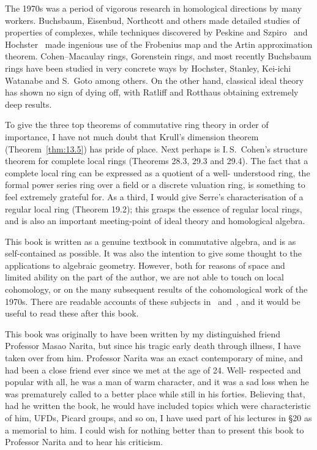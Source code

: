 The 1970s was a period of vigorous research in homological directions by
many workers. Buchsbaum, Eisenbud, Northcott and others made detailed
studies of properties of complexes, while techniques discovered by Peskine
and Szpiro~\cite{PS1} and Hochster~\cite{H} made ingenious use of the Frobenius
map and the Artin approximation theorem. Cohen--Macaulay rings,
Gorenstein rings, and most recently Buchsbaum rings have been studied in
very concrete ways by Hochster, Stanley, Kei-ichi Watanabe and S.\ Goto
among others. On the other hand, classical ideal theory has shown no sign
of dying off, with Ratliff and Rotthaus obtaining extremely deep results.

To give the three top theorems of commutative ring theory in order of
importance, I have not much doubt that Krull's dimension theorem
(Theorem~\ref{thm:13.5}) has pride of place. Next perhaps is I.\,S.\ Cohen's structure
theorem for complete local rings (Theorems 28.3, 29.3 and 29.4). The fact
that a complete local ring can be expressed as a quotient of a well-
understood ring, the formal power series ring over a field or a discrete
valuation ring, is something to feel extremely grateful for. As a third, I
would give Serre's characterisation of a regular local ring (Theorem 19.2);
this grasps the essence of regular local rings, and is also an important
meeting-point of ideal theory and homological algebra.

This book is written as a genuine textbook in commutative algebra, and
is as self-contained as possible. It was also the intention to give some
thought to the applications to algebraic geometry. However, both for
reasons of space and limited ability on the part of the author, we are not
able to touch on local cohomology, or on the many subsequent results of
the cohomological work of the 1970s. There are readable accounts of these
subjects in~\cite{G6} and~\cite{H}, and it would be useful to read these after this
book.

This book was originally to have been written by my distinguished friend
Professor Masao Narita, but since his tragic early death through illness, I
have taken over from him. Professor Narita was an exact contemporary of
mine, and had been a close friend ever since we met at the age of 24. Well-
respected and popular with all, he was a man of warm character, and it was
a sad loss when he was prematurely called to a better place while still in his
forties. Believing that, had he written the book, he would have included
topics which were characteristic of him, UFDs, Picard groups, and so on,
I have used part of his lectures in \S20 as a memorial to him. I could
wish for nothing better than to present this book to Professor Narita and to
hear his criticism.

